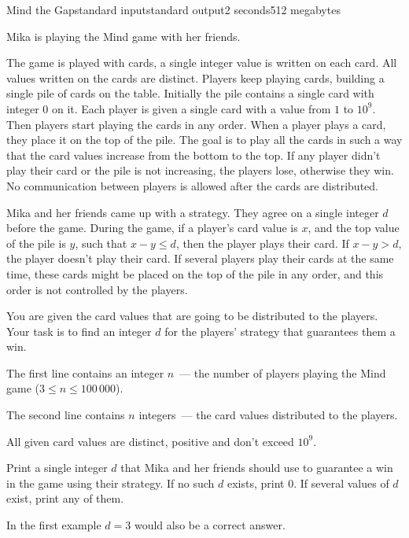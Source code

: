 \begin{problem}{Mind the Gap}{standard input}{standard output}{2 seconds}{512 megabytes}

Mika is playing the Mind game with her friends. 

The game is played with cards, a single integer value is written on each card. All values written on the cards are distinct. Players keep playing cards, building a single pile of cards on the table. Initially the pile contains a single card with integer $0$ on it. Each player is given a single card with a value from $1$ to $10^9$. Then players start playing the cards in any order. When a player plays a card, they place it on the top of the pile. The goal is to play all the cards in such a way that the card values increase from the bottom to the top. If any player didn't play their card or the pile is not increasing, the players lose, otherwise they win. No communication between players is allowed after the cards are distributed.

Mika and her friends came up with a strategy. They agree on a single integer $d$ before the game. During the game, if a player's card value is $x$, and the top value of the pile is $y$, such that $x - y \le d$, then the player plays their card. If $x - y > d$, the player doesn't play their card. If several players play their cards at the same time, these cards might be placed on the top of the pile in any order, and this order is not controlled by the players.

You are given the card values that are going to be distributed to the players. Your task is to find an integer $d$ for the players' strategy that guarantees them a win.

\InputFile
The first line contains an integer $n$~--- the number of players playing the Mind game ($3 \le n \le 100\,000$).

The second line contains $n$ integers~--- the card values distributed to the players.

All given card values are distinct, positive and don't exceed $10^9$.

\OutputFile
Print a single integer $d$ that Mika and her friends should use to guarantee a win in the game using their strategy. If no such $d$ exists, print $0$. If several values of $d$ exist, print any of them.

\Examples

\begin{example}
%
%
\end{example}

\Note
In the first example $d = 3$ would also be a correct answer.

\end{problem}

